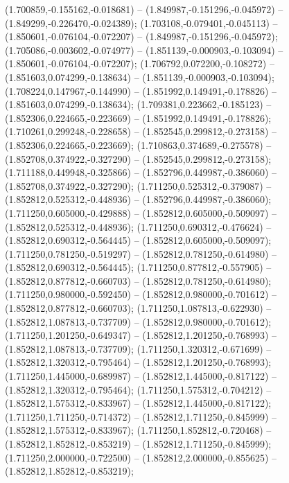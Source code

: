  (1.700859,-0.155162,-0.018681) -- (1.849987,-0.151296,-0.045972) -- (1.849299,-0.226470,-0.024389);
 (1.703108,-0.079401,-0.045113) -- (1.850601,-0.076104,-0.072207) -- (1.849987,-0.151296,-0.045972);
 (1.705086,-0.003602,-0.074977) -- (1.851139,-0.000903,-0.103094) -- (1.850601,-0.076104,-0.072207);
 (1.706792,0.072200,-0.108272) -- (1.851603,0.074299,-0.138634) -- (1.851139,-0.000903,-0.103094);
 (1.708224,0.147967,-0.144990) -- (1.851992,0.149491,-0.178826) -- (1.851603,0.074299,-0.138634);
 (1.709381,0.223662,-0.185123) -- (1.852306,0.224665,-0.223669) -- (1.851992,0.149491,-0.178826);
 (1.710261,0.299248,-0.228658) -- (1.852545,0.299812,-0.273158) -- (1.852306,0.224665,-0.223669);
 (1.710863,0.374689,-0.275578) -- (1.852708,0.374922,-0.327290) -- (1.852545,0.299812,-0.273158);
 (1.711188,0.449948,-0.325866) -- (1.852796,0.449987,-0.386060) -- (1.852708,0.374922,-0.327290);
 (1.711250,0.525312,-0.379087) -- (1.852812,0.525312,-0.448936) -- (1.852796,0.449987,-0.386060);
 (1.711250,0.605000,-0.429888) -- (1.852812,0.605000,-0.509097) -- (1.852812,0.525312,-0.448936);
 (1.711250,0.690312,-0.476624) -- (1.852812,0.690312,-0.564445) -- (1.852812,0.605000,-0.509097);
 (1.711250,0.781250,-0.519297) -- (1.852812,0.781250,-0.614980) -- (1.852812,0.690312,-0.564445);
 (1.711250,0.877812,-0.557905) -- (1.852812,0.877812,-0.660703) -- (1.852812,0.781250,-0.614980);
 (1.711250,0.980000,-0.592450) -- (1.852812,0.980000,-0.701612) -- (1.852812,0.877812,-0.660703);
 (1.711250,1.087813,-0.622930) -- (1.852812,1.087813,-0.737709) -- (1.852812,0.980000,-0.701612);
 (1.711250,1.201250,-0.649347) -- (1.852812,1.201250,-0.768993) -- (1.852812,1.087813,-0.737709);
 (1.711250,1.320312,-0.671699) -- (1.852812,1.320312,-0.795464) -- (1.852812,1.201250,-0.768993);
 (1.711250,1.445000,-0.689987) -- (1.852812,1.445000,-0.817122) -- (1.852812,1.320312,-0.795464);
 (1.711250,1.575312,-0.704212) -- (1.852812,1.575312,-0.833967) -- (1.852812,1.445000,-0.817122);
 (1.711250,1.711250,-0.714372) -- (1.852812,1.711250,-0.845999) -- (1.852812,1.575312,-0.833967);
 (1.711250,1.852812,-0.720468) -- (1.852812,1.852812,-0.853219) -- (1.852812,1.711250,-0.845999);
 (1.711250,2.000000,-0.722500) -- (1.852812,2.000000,-0.855625) -- (1.852812,1.852812,-0.853219);
